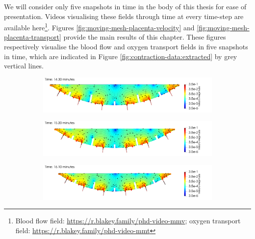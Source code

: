             We will consider only five snapshots in time in the body of this thesis for ease of presentation. Videos visualising these fields through time at every time-step are available here\footnote{Blood flow field: \url{https://r.blakey.family/phd-video-mmv}; oxygen transport field: \url{https://r.blakey.family/phd-video-mmt}}. Figures \ref{fig:moving-mesh-placenta-velocity} and \ref{fig:moving-mesh-placenta-transport} provide the main results of this chapter. These figures respectively visualise the blood flow and oxygen transport fields in five snapshots in time, which are indicated in Figure \ref{fig:contraction-data:extracted} by grey vertical lines.

            \begin{figure}
                \centering
                \begin{subfigure}{\textwidth}
                    \includegraphics[width=\textwidth]{diagrams/results-contractions/placenta-moving-mesh/mm-placenta-velocity.0000.png}
                    \caption{}
                    \label{fig:moving-mesh-placenta-velocity:1}
                \end{subfigure}
                \begin{subfigure}{\textwidth}
                    \includegraphics[width=\textwidth]{diagrams/results-contractions/placenta-moving-mesh/mm-placenta-velocity.0025.png}
                    \caption{}
                    \label{fig:moving-mesh-placenta-velocity:2}
                \end{subfigure}
                \begin{subfigure}{\textwidth}
                    \includegraphics[width=\textwidth]{diagrams/results-contractions/placenta-moving-mesh/mm-placenta-velocity.0050.png}

\end{subfigure}
\end{figure}
